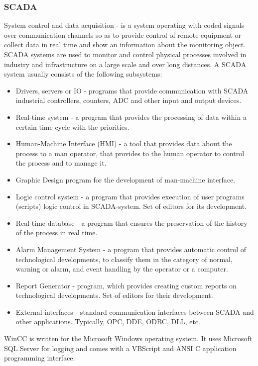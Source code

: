 \documentclass[english]{article}
\begin{document}
\subsubsection{SCADA} 
System control and data acquisition - is a system operating with coded signals over communication channels so as to provide control of remote equipment or collect data in real time and show an information about the monitoring object. SCADA systems are used to monitor and control physical processes involved in industry and infrastructure on a large scale and over long distances. 
A SCADA system usually consists of the following subsystems:
\begin{itemize}
\item Drivers, servers or IO - programs that provide communication with SCADA industrial controllers, counters, ADC and other input and output devices.
\item Real-time system - a program that provides the processing of data within a certain time cycle with the priorities.
\item Human-Machine Interface (HMI) - a tool that provides data about the process to a man operator, that provides to the human operator to control the process and to manage it.
\item Graphic Design program for the development of man-machine interface.
\item Logic control system - a program that provides execution of user programs (scripts) logic control in SCADA-system. Set of editors for its development.
\item Real-time database - a program that ensures the preservation of the history of the process in real time.
\item Alarm Management System - a program that provides automatic control of technological developments, to classify them in the category of normal, warning or alarm, and event handling by the operator or a computer.
\item Report Generator - program, which provides creating custom reports on technological developments. Set of editors for their development.
\item External interfaces - standard communication interfaces between SCADA and other applications. Typically, OPC, DDE, ODBC, DLL, etc.
\end{itemize}
WinCC is written for the Microsoft Windows operating system. It uses Microsoft SQL Server for logging and comes with a VBScript and ANSI C application programming interface.\\
\end{document}
